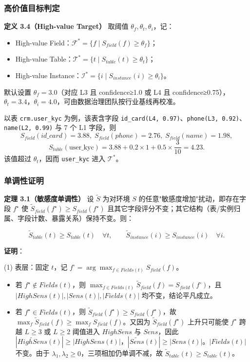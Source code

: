 \documentclass[a4paper,12pt]{ctexart}
\begin{document}
\subsubsection{高价值目标判定}

\textbf{定义 3.4（High-value Target）} 取阈值 $\theta_f, \theta_t, \theta_i$，记：

\begin{itemize}[leftmargin=*]
\item High-value Field：$\mathcal{F}^{*} = \{f \mid S_{field}(f) \ge \theta_f\}$；
\item High-value Table：$\mathcal{T}^{*} = \{t \mid S_{table}(t) \ge \theta_t\}$；
\item High-value Instance：$\mathcal{I}^{*} = \{i \mid S_{instance}(i) \ge \theta_i\}$。
\end{itemize}

默认设置 $\theta_f = 3.0$（对应 L3 且 confidence≥1.0 或 L4 且 confidence≥0.75），$\theta_t = 3.4$，$\theta_i = 4.0$，可由数据治理团队按行业基线再校准。

以表 \texttt{crm.user\_kyc} 为例，该表含字段 \texttt{id\_card(L4, 0.97)}、\texttt{phone(L3, 0.92)}、\texttt{name(L2, 0.99)} 与 7 个 L1 字段，则
\[S_{field}(id\_card)=3.88,\;S_{field}(phone)=2.76,\;S_{field}(name)=1.98,\]
\[S_{table}(\text{user\_kyc}) = 3.88 + 0.2 \times 1 + 0.5 \times \frac{3}{10} = 4.23.\]
该值超过 $\theta_t$，因而 \texttt{user\_kyc} 进入 $\mathcal{T}^{*}$。

\subsubsection{单调性证明}

\textbf{定理 3.1（敏感度单调性）} 设 $\widetilde{S}$ 为对环境 $S$ 的任意"敏感度增加"扰动，即存在字段 $f^{\star}$ 使 $\widetilde{S}_{field}(f^{\star}) \ge S_{field}(f^{\star})$ 且其它字段评分不变；其它结构（表/实例归属、字段计数、暴露关系）保持不变。则：

\[\widetilde{S}_{table}(t) \ge S_{table}(t) \quad \forall t,\qquad \widetilde{S}_{instance}(i) \ge S_{instance}(i) \quad \forall i.\]

\textbf{证明}：

(1) 表层：固定 $t$，记 $f^{\circ} = \arg\max_{f \in Fields(t)} S_{field}(f)$。

\begin{itemize}[leftmargin=*]
\item 若 $f^{\star} \notin Fields(t)$，则 $\max_{f \in Fields(t)} \widetilde{S}_{field}(f) = S_{field}(f^{\circ})$，且 $|HighSens(t)|, |Sens(t)|, |Fields(t)|$ 均不变，结论平凡成立。
\item 若 $f^{\star} \in Fields(t)$，则 $\widetilde{S}_{field}(f^{\star}) \ge S_{field}(f^{\star})$，故 $\max_{f} \widetilde{S}_{field}(f) \ge \max_{f} S_{field}(f)$。又因为 $\widetilde{S}_{field}(f^{\star})$ 上升只可能使 $f^{\star}$ 跨越 $L\ge 3$ 或 $L\ge 2$ 阈值进入 $HighSens$ 与 $Sens$，因此 $|\widetilde{HighSens}(t)| \ge |HighSens(t)|$，$|\widetilde{Sens}(t)| \ge |Sens(t)|$。$|Fields(t)|$ 不变。由于 $\lambda_1, \lambda_2 \ge 0$，三项相加仍单调不减，故 $\widetilde{S}_{table}(t) \ge S_{table}(t)$。
\end{itemize}
\end{document}

